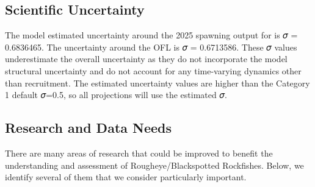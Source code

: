 \documentclass[
]{scrartcl}
\begin{document}
\subsection{Scientific Uncertainty}\label{scientific-uncertainty}

The model estimated uncertainty around the 2025 spawning output for is 𝜎
= 0.6836465. The uncertainty around the OFL is 𝜎 = 0.6713586. These 𝜎
values underestimate the overall uncertainty as they do not incorporate
the model structural uncertainty and do not account for any time-varying
dynamics other than recruitment. The estimated uncertainty values are
higher than the Category 1 default 𝜎=0.5, so all projections will use
the estimated 𝜎.

\subsection{Research and Data Needs}\label{research-and-data-needs}

There are many areas of research that could be improved to benefit the
understanding and assessment of Rougheye/Blackspotted Rockfishes. Below,
we identify several of them that we consider particularly important.
\end{document}
